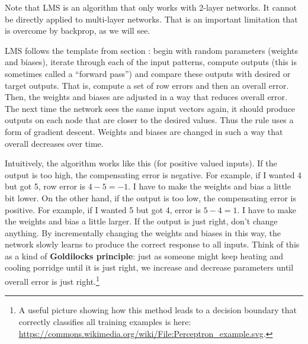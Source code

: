 Note that LMS is an algorithm that only works with 2-layer networks. It cannot be directly applied to multi-layer networks. That is an important limitation that is overcome by backprop, as we will see.

LMS follows the template from section :  begin with  random parameters (weights and biases), iterate through each of the input patterns, compute outputs (this is sometimes called a ``forward pass'') and compare these outputs with desired or target outputs. That is, compute a set of row errors and then an overall error. Then, the weights and biases are adjusted in a way that reduces overall error. The next time the network sees the same input vectors again, it should produce outputs on each node that are closer to the desired values. Thus the rule uses a form of gradient descent. Weights and biases are changed in such a way that overall decreases over time. 

Intuitively, the algorithm works like this (for positive valued inputs). If the output is too high, the compensating error is negative. For example, if I wanted 4 but got 5, row error is $4-5 = -1$. I have to make the weights and bias a little bit lower. On the other hand, if the output is too low, the compensating error is positive. For example, if I wanted 5 but got 4, error is $5-4 = 1$. I have to make the weights and bias a little larger. If the output is just right, don't change anything. By incrementally changing the weights and biases in this way, the network slowly learns to produce the correct response to all inputs. Think of this as a kind of {\bf Goldilocks principle}: just as someone might keep heating and cooling porridge until it is just right, we increase and decrease parameters until overall error is just right.\footnote{A useful picture showing how this method leads to a decision boundary that correctly classifies all training examples is here: \url{https://commons.wikimedia.org/wiki/File:Perceptron_example.svg}.}
 
